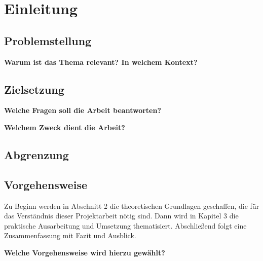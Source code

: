 
\chapter{Einleitung}


\section{Problemstellung}
\begin{description}
	\item \textbf{Warum ist das Thema relevant? In welchem Kontext?}

\end{description}	

\section{Zielsetzung}
\begin{description}
	\item \textbf{Welche Fragen soll die Arbeit beantworten?}
	\item \textbf{Welchem Zweck dient die Arbeit?}
\end{description}


\section{Abgrenzung}


\section{Vorgehensweise}
Zu Beginn werden in Abschnitt 2 die theoretischen Grundlagen geschaffen, die für das Verständnis dieser Projektarbeit nötig sind.
Dann wird in Kapitel 3 die praktische Ausarbeitung und Umsetzung thematisiert.
Abschließend folgt eine Zusammenfassung mit Fazit und Ausblick.

\begin{description}
	\item \textbf{Welche Vorgehensweise wird hierzu gewählt?}
\end{description}









